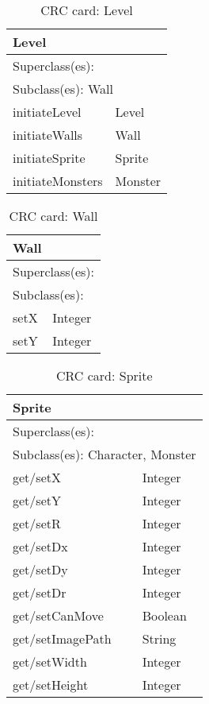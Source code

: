 \begin{table}[]
\centering
\label{crc_level}
\begin{tabular}{|l|l|}
\hline
\multicolumn{2}{|l|}{Level} \\ \hline
\multicolumn{2}{|l|}{Superclass(es):} \\ \hline
\multicolumn{2}{|l|}{Subclass(es): Wall} \\ \hline
initiateLevel           & Level \\ \hline
initiateWalls           & Wall \\ \hline
initiateSprite          & Sprite \\ \hline
initiateMonsters        & Monster \\ \hline
\end{tabular}
\caption{CRC card: Level}
\end{table}

\begin{table}[]
\centering
\label{crc_wall}
\begin{tabular}{|l|l|}
\hline
\multicolumn{2}{|l|}{Wall} \\ \hline
\multicolumn{2}{|l|}{Superclass(es):} \\ \hline
\multicolumn{2}{|l|}{Subclass(es):} \\ \hline
setX           & Integer \\ \hline
setY           & Integer\\ \hline
\end{tabular}
\caption{CRC card: Wall}
\end{table}

\begin{table}[]
\centering
\label{crc_sprite}
\begin{tabular}{|l|l|}
\hline
\multicolumn{2}{|l|}{Sprite} \\ \hline
\multicolumn{2}{|l|}{Superclass(es):} \\ \hline
\multicolumn{2}{|l|}{Subclass(es): Character, Monster} \\ \hline
get/setX           & Integer \\ \hline
get/setY           & Integer \\ \hline
get/setR           & Integer \\ \hline
get/setDx          & Integer \\ \hline
get/setDy          & Integer \\ \hline
get/setDr          & Integer \\ \hline
get/setCanMove     & Boolean \\ \hline
get/setImagePath   & String \\ \hline
get/setWidth       & Integer \\ \hline
get/setHeight      & Integer \\ \hline
\end{tabular}
\caption{CRC card: Sprite}
\end{table}

